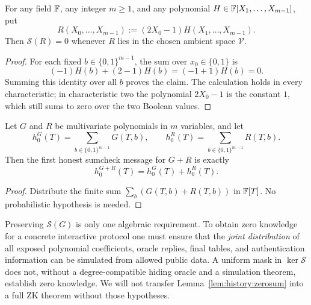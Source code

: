 \begin{lemma}\label{lem:history:explicit-mask}
For any field $\mathbb{F}$, any integer $m\geq1$, and any polynomial $H\in\mathbb{F}[X_1,\ldots,X_{m-1}]$, put
\[
 R(X_0,\ldots,X_{m-1}):=(2X_0-1)H(X_1,\ldots,X_{m-1}).
\]
Then $\mathscr S(R)=0$ whenever $R$ lies in the chosen ambient space $\mathcal V$.
\end{lemma}
\begin{proof}
For each fixed $b\in\{0,1\}^{m-1}$, the sum over $x_0\in\{0,1\}$ is
\[
  (-1)H(b)+(2-1)H(b)=(-1+1)H(b)=0.
\]
Summing this identity over all $b$ proves the claim. The calculation holds in every characteristic; in characteristic two the polynomial $2X_0-1$ is the constant $1$, which still sums to zero over the two Boolean values.
\end{proof}

\begin{lemma}\label{lem:history:round-mask}
Let $G$ and $R$ be multivariate polynomials in $m$ variables, and let
\[
 h^G_0(T)=\sum_{b\in\{0,1\}^{m-1}}G(T,b),\qquad
 h^R_0(T)=\sum_{b\in\{0,1\}^{m-1}}R(T,b).
\]
Then the first honest sumcheck message for $G+R$ is exactly
\[
 h^{G+R}_0(T)=h^G_0(T)+h^R_0(T).
\]
\end{lemma}
\begin{proof}
Distribute the finite sum $\sum_b(G(T,b)+R(T,b))$ in $\mathbb{F}[T]$. No probabilistic hypothesis is needed.
\end{proof}

\begin{remark}\label{rem:history:mask-not-full}
Preserving $\mathscr S(G)$ is only one algebraic requirement. To obtain zero knowledge for a concrete interactive protocol one must ensure that the \emph{joint distribution} of all exposed polynomial coefficients, oracle replies, final tables, and authentication information can be simulated from allowed public data. A uniform mask in $\ker\mathscr S$ does not, without a degree-compatible hiding oracle and a simulation theorem, establish zero knowledge. We will not transfer Lemma~\ref{lem:history:zerosum} into a full ZK theorem without those hypotheses.
\end{remark}
